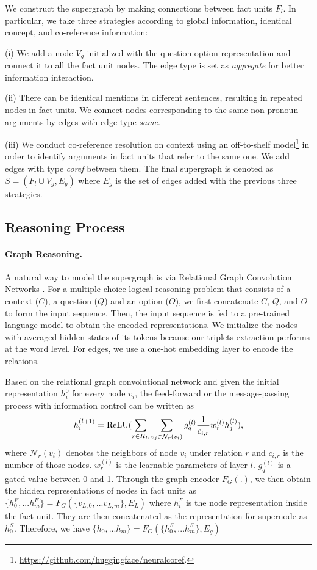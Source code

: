 \documentclass[11pt]{article}
\begin{document}
We construct the supergraph by making connections between fact units $F_l$. In particular, we take three strategies according to global information, identical concept, and co-reference information:

(i) We add a node $V_g$ initialized with the question-option representation and connect it to all the fact unit nodes. The edge type is set as \textit{aggregate} for better information interaction. 

(ii) There can be identical mentions in different sentences, resulting in repeated nodes in fact units. We connect nodes corresponding to the same non-pronoun arguments by edges with edge type \textit{same}. 

(iii) We conduct co-reference resolution on context using an off-to-shelf model\footnote{\url{https://github.com/huggingface/neuralcoref}.} in order to identify arguments in fact units that refer to the same one. We add edges with type \textit{coref} between them. The final supergraph is denoted as $S = (F_l\cup V_g, E_g)$ where $E_g$ is the set of edges added with the previous three strategies.


\subsection{Reasoning Process}
\paragraph{Graph Reasoning.}A natural way to model the supergraph is via Relational Graph Convolution Networks \citep{10.1007/978-3-319-93417-4_38}. For a multiple-choice logical reasoning problem that consists of a context ($C$), a question ($Q$) and an option ($O$), we first concatenate $C$, $Q$, and $O$ to form the input sequence. Then, the input sequence is fed to a pre-trained language model to obtain the encoded representations. We initialize the nodes with averaged hidden states of its tokens because our triplets extraction performs at the word level. For edges, we use a one-hot embedding layer to encode the relations.

Based on the relational graph convolutional network  and given the initial representation $h_i^0$ for every node $v_i$, the feed-forward or the message-passing process with information control can be written as
\begin{equation}
    h_i^{(l+1)}=\textup{ReLU}(\sum_{r\in R_L}\sum_{v_j\in \mathcal{N}_r(v_i)}g_{q}^{(l)}\frac{1}{c_{i,r}}w_r^{(l)}h_j^{(l)}),
\end{equation}
where $\mathcal{N}_r(v_i)$ denotes the neighbors of node $v_i$ under relation $r$ and $c_{i,r}$ is the number of those nodes. $w_r^{(l)}$ is the learnable parameters of layer $l$. $g_q^{(l)}$ is a gated value between 0 and 1. Through the graph encoder $F_G(.)$, we then obtain the hidden representations of nodes in fact units as $\{h_0^F,...h_m^F\} = F_G(\{v_{L,0},...v_{L,m}\},E_L)$ where $h_i^F$ is the node representation inside the fact unit. They are then concatenated as the representation for supernode as $h_0^S$. Therefore, we have $\{h_0,...h_m\} = F_G(\{h_0^S,...h_m^S\},E_g)$
\end{document}
